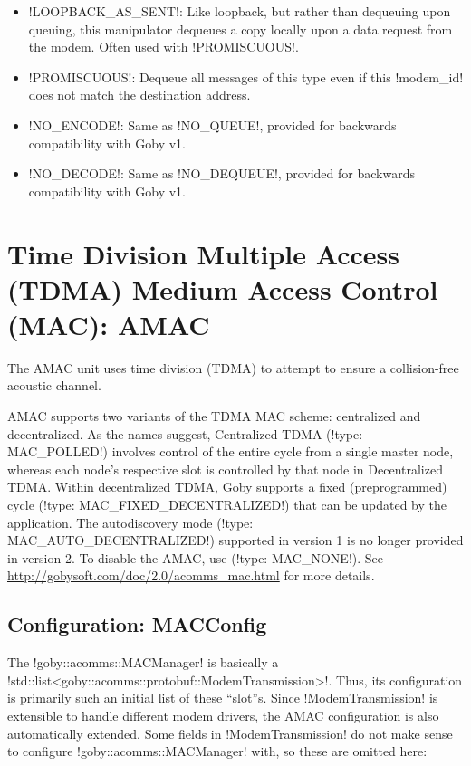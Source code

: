 \begin{itemize}
\begin{itemize}
\begin{itemize}
\item !LOOPBACK_AS_SENT!: Like loopback, but rather than dequeuing upon queuing, this manipulator dequeues a copy locally upon a data request from the modem. Often used with !PROMISCUOUS!.
\item !PROMISCUOUS!: Dequeue all messages of this type even if this !modem_id! does not match the destination address.
\item !NO_ENCODE!: Same as !NO_QUEUE!, provided for backwards compatibility with Goby v1.
\item !NO_DECODE!: Same as !NO_DEQUEUE!, provided for backwards compatibility with Goby v1.
\end{itemize}
\end{itemize}
\end{itemize}


\section{Time Division Multiple Access (TDMA) Medium Access Control (MAC): AMAC} \label{sec:amac}

The AMAC unit uses time division (TDMA) to attempt to ensure a collision-free acoustic channel.

AMAC supports two variants of the TDMA MAC scheme: centralized and decentralized. As the names suggest, Centralized TDMA (!type: MAC_POLLED!) involves control of the entire cycle from a single master node, whereas each node's respective slot is controlled by that node in Decentralized TDMA. Within decentralized TDMA, Goby supports a fixed (preprogrammed) cycle (!type: MAC_FIXED_DECENTRALIZED!) that can be updated by the application. The autodiscovery mode (!type: MAC_AUTO_DECENTRALIZED!) supported in version 1 is no longer provided in version 2. To disable the AMAC, use (!type: MAC_NONE!). See \url{http://gobysoft.com/doc/2.0/acomms_mac.html} for more details.

\subsection{Configuration: MACConfig}

The !goby::acomms::MACManager! is basically a !std::list<goby::acomms::protobuf::ModemTransmission>!. Thus, its configuration is primarily such an initial list of these ``slot''s. Since !ModemTransmission! is extensible to handle different modem drivers, the AMAC configuration is also automatically extended. Some fields in !ModemTransmission! do not make sense to configure !goby::acomms::MACManager! with, so these are omitted here:


